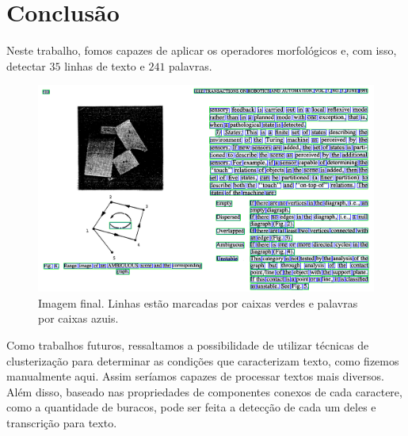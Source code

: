 \documentclass[twocolumn, 10pt]{article}
\begin{document}
\section*{Conclusão}
\label{sec:org43673dc}
Neste trabalho, fomos capazes de aplicar os operadores morfológicos e, com isso, detectar \(35\) linhas de texto e \(241\) palavras.
\begin{figure}[htbp]
\centering
\includegraphics[width=.9\linewidth]{./img/out.png}
\caption{Imagem final. Linhas estão marcadas por caixas verdes e palavras por caixas azuis.}
\end{figure}

Como trabalhos futuros, ressaltamos a possibilidade de utilizar técnicas de clusterização para determinar as condições que caracterizam texto, como fizemos manualmente aqui. Assim seríamos capazes de processar textos mais diversos.
Além disso, baseado nas propriedades de componentes conexos de cada caractere, como a quantidade de buracos, pode ser feita a detecção de cada um deles e transcrição para texto.
\end{document}
